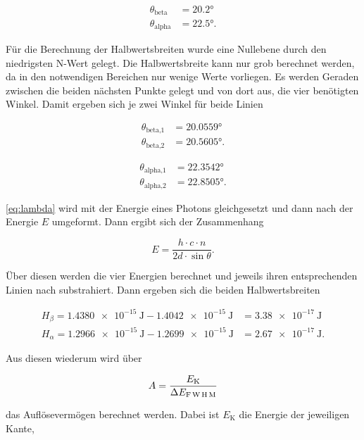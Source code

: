 \begin{align*}
    \theta _\text{beta} &= \ang{20.2}\\
    \theta _\text{alpha} &= \ang{22.5}.
\end{align*}

Für die Berechnung der Halbwertsbreiten wurde eine Nullebene durch den niedrigsten N-Wert gelegt.
Die Halbwertsbreite kann nur grob berechnet werden, da in den notwendigen Bereichen nur wenige Werte vorliegen.
Es werden Geraden zwischen die beiden nächsten Punkte gelegt und von dort aus, die vier benötigten Winkel.
Damit ergeben sich je zwei Winkel für beide Linien

\begin{align*}
    \theta _\text{beta,1} &= \ang{20.0559}\\
    \theta _\text{beta,2} &= \ang{20.5605}.
\end{align*}

\begin{align*}
    \theta _\text{alpha,1} &= \ang{22.3542}\\
    \theta _\text{alpha,2} &= \ang{22.8505}.
\end{align*}

\eqref{eq:lambda} wird mit der Energie eines Photons gleichgesetzt und dann nach der Energie $E$ umgeformt.
Dann ergibt sich der Zusammenhang

\begin{equation}
    E = \frac{h \cdot c \cdot n}{2d \cdot \sin{\theta}}.
    \label{eq:energie}
\end{equation}

Über diesen werden die vier Energien berechnet und jeweils ihren entsprechenden Linien nach substrahiert.
Dann ergeben sich die beiden Halbwertsbreiten

\begin{align*}
    H_ \beta = \SI{1.4380e-15}{\joule} - \SI{1.4042e-15}{\joule} &= \SI{3.38e-17}{\joule}\\
    H_ \alpha = \SI{1.2966e-15}{\joule} - \SI{1.2699e-15}{\joule} &= \SI{2.67e-17}{\joule}.
\end{align*}

Aus diesen wiederum  wird über 

\begin{equation}
    A = \frac{E_\text{K}}{\Delta E_ \text{F\,W\,H\,M}}
    \label{eq:aufloes}
\end{equation}

das Auflösevermögen berechnet werden.
Dabei ist $E_\text{K}$ die Energie der jeweiligen Kante, 

